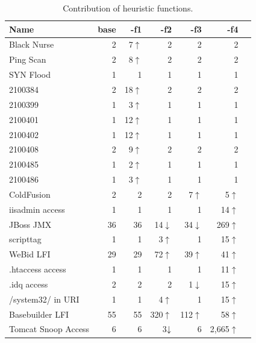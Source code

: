 \documentclass[conference]{IEEEtran}
\begin{document}
\begin{table}[t!]
  \footnotesize
  \setlength{\tabcolsep}{8pt}
  \renewcommand{\arraystretch}{-0.01}
  \caption{\label{table:weights}Contribution of heuristic functions.}
  \vspace{-2ex}
  \centering
  \begin{tabular}{lrrrrrr}
    \toprule
    Name &
    base &
    -f1 &
    -f2 &    
    -f3 &
    -f4 \\
    \midrule
    Black Nurse & 2 & 7$\uparrow$ & 2 & 2 & 2 \\    
    Ping Scan & 2 &  8$\uparrow$& 2 & 2 & 2 \\
    SYN Flood & 1 & 1 & 1 & 1 & 1 \\
    2100384 & 2 & 18$\uparrow$& 2 & 2 & 2 \\
    2100399 & 1 & 3$\uparrow$ & 1 & 1 & 1 \\
    2100401 & 1 & 12$\uparrow$ & 1 & 1 & 1 \\
    2100402 & 1 & 12$\uparrow$ & 1 & 1 & 1 \\
    2100408 & 2 & 9$\uparrow$ & 2 & 2 & 2 \\
    2100485 & 1 & 2$\uparrow$ & 1 & 1 & 1 \\
    2100486 & 1 & 3$\uparrow$ & 1 & 1 & 1 \\
    \midrule
    ColdFusion & 2 & 2 & 2 & 7$\uparrow$ & 5$\uparrow$ \\
    iisadmin access & 1  & 1 & 1 & 1 & 14$\uparrow$\\        
    JBoss JMX & 36 & 36 & 14\cellcolor{lightgray}$\downarrow$ & 34\cellcolor{lightgray}$\downarrow$ & 269$\uparrow$ \\
    scripttag & 1 & 1 & 3$\uparrow$ & 1 & 15$\uparrow$ \\
    WeBid LFI & 29 & 29 & 72$\uparrow$ & 39$\uparrow$ & 41$\uparrow$ \\    
    .htaccess access & 1  & 1 & 1 & 1 & 11$\uparrow$\\
    .idq access & 2  & 2 & 2 & 1\cellcolor{lightgray}$\downarrow$ & 15$\uparrow$ \\
    /system32/ in URI & 1  & 1 & 4$\uparrow$ & 1 & 15$\uparrow$\\
    Basebuilder LFI & 55  & 55 & 320$\uparrow$ & 112$\uparrow$ & 58$\uparrow$\\
      Tomcat Snoop Access & 6 & 6 & 3$\cellcolor{lightgray}\downarrow$ & 6 & 2,665$\uparrow$\\
    \bottomrule
  \end{tabular}
\end{table}
\end{document}
